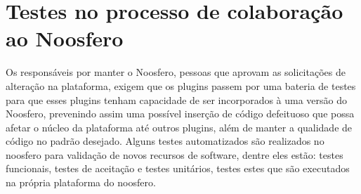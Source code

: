 
\section{Testes no processo de colaboração ao Noosfero}
%
Os responsáveis por manter o Noosfero, pessoas que aprovam as solicitações de 
alteração na plataforma, exigem que os plugins passem por uma bateria de testes 
para que esses plugins tenham capacidade de ser incorporados à uma versão do 
Noosfero, prevenindo assim uma possível  inserção de código defeituoso que possa 
afetar o núcleo da plataforma até outros  plugins, além de manter a qualidade de 
código no padrão desejado.
%
Alguns testes automatizados são realizados no noosfero para validação de novos 
recursos de software, dentre eles estão: testes funcionais, testes de aceitação e 
testes unitários, testes estes que são executados na própria plataforma do noosfero.
%
